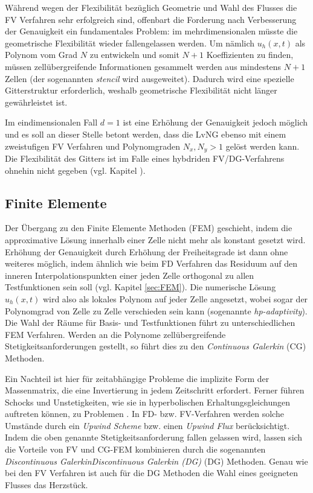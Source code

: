 Während wegen der Flexibilität bezüglich Geometrie und Wahl des Flusses die FV Verfahren sehr erfolgreich sind, offenbart die Forderung nach Verbesserung der Genauigkeit ein fundamentales Problem: im mehrdimensionalen müsste die geometrische Flexibilität wieder fallengelassen werden. Um nämlich $u_h(x,t)$ als Polynom vom Grad $N$ zu entwickeln und somit ${N+1}$ Koeffizienten zu finden, müssen zellübergreifende Informationen gesammelt werden aus mindestens ${N+1}$ Zellen (der sogenannten \emph{stencil} wird ausgeweitet). Dadurch wird eine spezielle Gitterstruktur erforderlich, weshalb geometrische Flexibilität nicht länger gewährleistet ist.

Im eindimensionalen Fall $d=1$ ist eine Erhöhung der Genauigkeit jedoch möglich und es soll an dieser Stelle betont werden, dass die LvNG ebenso mit einem zweistufigen FV Verfahren und Polynomgraden ${N_x,N_y > 1}$ gelöst werden kann. Die Flexibilität des Gitters ist im Falle eines hybdriden FV/DG-Verfahrens ohnehin nicht gegeben (vgl. Kapitel ).

\subsection{Finite Elemente}
Der Übergang zu den Finite Elemente Methoden (FEM) geschieht, indem die approximative Lösung innerhalb einer Zelle nicht mehr als konstant gesetzt wird. Erhöhung der Genauigkeit durch Erhöhung der Freiheitsgrade ist dann ohne weiteres möglich, indem ähnlich wie beim FD Verfahren das Residuum auf den inneren Interpolationspunkten einer jeden Zelle orthogonal zu allen Testfunktionen sein soll (vgl. Kapitel \ref{sec:FEM}). Die numerische Lösung $u_h(x,t)$ wird also als lokales Polynom auf jeder Zelle angesetzt, wobei sogar der Polynomgrad von Zelle zu Zelle verschieden sein kann (sogenannte \emph{hp-adaptivity}). Die Wahl der Räume für Basis- und Testfunktionen führt zu unterschiedlichen FEM Verfahren. Werden an die Polynome zellübergreifende Stetigkeitsanforderungen gestellt, so führt dies zu den \emph{Continuous Galerkin} (CG) Methoden.

Ein Nachteil ist hier für zeitabhängige Probleme die implizite Form der Massenmatrix, die eine Invertierung in jedem Zeitschritt erfordert. Ferner führen Schocks und Unstetigkeiten, wie sie in hyperbolischen Erhaltungsgleichungen auftreten können, zu Problemen \cite{dolejvsi2015discontinuous}. In FD- bzw. FV-Verfahren werden solche Umstände durch ein \emph{Upwind Scheme} bzw. einen \emph{Upwind Flux} berücksichtigt. Indem die oben genannte Stetigkeitsanforderung fallen gelassen wird, lassen sich die Vorteile von FV und CG-FEM kombinieren durch die sogenannten  \emph{Discontinuous Galerkin}\emph{Discontinuous Galerkin (DG)} (DG) Methoden. Genau wie bei den FV Verfahren ist auch für die DG Methoden die Wahl eines geeigneten Flusses das Herzstück.

